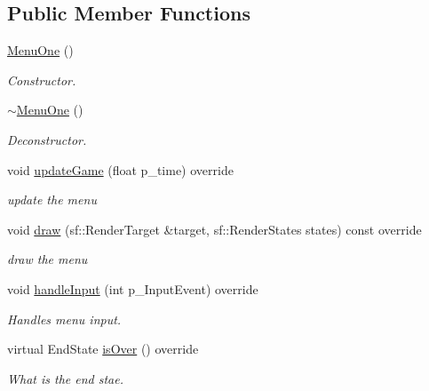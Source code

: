\subsection*{Public Member Functions}
\begin{DoxyCompactItemize}
\item 
\mbox{\label{class_menu_one_af646b18d41ccf6412d40c4534c87859b}} 
\mbox{\hyperlink{class_menu_one_af646b18d41ccf6412d40c4534c87859b}{Menu\+One}} ()
\begin{DoxyCompactList}\small\item\em Constructor. \end{DoxyCompactList}\item 
\mbox{\label{class_menu_one_a42980aef723c12ee5fcb3a7b2be9490e}} 
\mbox{\hyperlink{class_menu_one_a42980aef723c12ee5fcb3a7b2be9490e}{$\sim$\+Menu\+One}} ()
\begin{DoxyCompactList}\small\item\em Deconstructor. \end{DoxyCompactList}\item 
\mbox{\label{class_menu_one_ac0d1bdcb57588c6efd661979afd384e1}} 
void \mbox{\hyperlink{class_menu_one_ac0d1bdcb57588c6efd661979afd384e1}{update\+Game}} (float p\+\_\+time) override
\begin{DoxyCompactList}\small\item\em update the menu \end{DoxyCompactList}\item 
void \mbox{\hyperlink{class_menu_one_a861529b6fcc30daebc753186714e3cc9}{draw}} (sf\+::\+Render\+Target \&target, sf\+::\+Render\+States states) const override
\begin{DoxyCompactList}\small\item\em draw the menu \end{DoxyCompactList}\item 
void \mbox{\hyperlink{class_menu_one_aee28812124909d8734eeeaecfde35f0f}{handle\+Input}} (int p\+\_\+\+Input\+Event) override
\begin{DoxyCompactList}\small\item\em Handles menu input. \end{DoxyCompactList}\item 
virtual End\+State \mbox{\hyperlink{class_menu_one_aa1d50806994903b77d44d241d7755404}{is\+Over}} () override
\begin{DoxyCompactList}\small\item\em What is the end stae. \end{DoxyCompactList}\item 

\end{DoxyCompactItemize}
